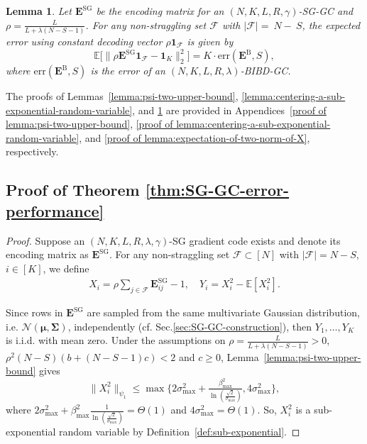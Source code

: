 \documentclass[lettersize,journal]{IEEEtran}
\newcommand{\err}[1]{\mathrm{err}(#1, S)}
\newcommand{\norm}[1]{\left\lVert#1\right\rVert}
\newcommand{\ones}[1]{\boldsymbol{1}_{#1}}
\newcommand{\F}{\mathcal{F}}
\newcommand{\GSG}{\boldsymbol{E}^{\mathrm{SG}}}
\newcommand{\GB}{\boldsymbol{E}^{\mathrm{B}}}
\newcommand{\gaussian}[2]{\mathcal{N}(#1, #2)}
\newcommand{\muu}{\boldsymbol{\mu}}
\newcommand{\Sigmaa}{\boldsymbol{\Sigma}}
\newcommand{\ex}[1]{\mathbb{E}\left[#1\right]}
\newcommand{\psione}[1]{\|#1\|_{\psi_1} }
\newcommand{\sigmamax}{\sigma_{\max}}
\newcommand{\betamax}{\beta_{\max}}
\newtheorem{lemma}{Lemma}
\begin{document}
{\begin{lemma}
\label{lemma:expectation-of-two-norm-of-X}
Let $\GSG$ be the encoding matrix for an $(N, K, L, R, \gamma)$-SG-GC and $\rho = \frac{L}{L+\lambda(N-S-1)}$. For any non-straggling set $\F$ with $|\F| =~N-~S$, the expected error using constant decoding vector $\rho\ones{\F}$ is given by
  \[
    \mathbb{E}\big[{\|\rho\GSG\ones{\F} - \ones{K}}\|_2^2\big]=K\cdot\err{\GB},
    \]
     where $\err{\GB}$ is the error of an $(N, K, L, R, \lambda)$-BIBD-GC.
\end{lemma}
The proofs of Lemmas~\ref{lemma:psi-two-upper-bound}, \ref{lemma:centering-a-sub-exponential-random-variable}, and \ref{lemma:expectation-of-two-norm-of-X} are provided in Appendices~\ref{proof of lemma:psi-two-upper-bound}, \ref{proof of lemma:centering-a-sub-exponential-random-variable}, and \ref{proof of lemma:expectation-of-two-norm-of-X}, respectively.

\subsection{Proof of Theorem \ref{thm:SG-GC-error-performance}}
\begin{proof}
\label{proof of thm:SG-GC-error-performance}
Suppose an $(N, K, L, R, \lambda, \gamma)$-SG gradient code exists and
denote its encoding matrix as $\GSG$. For any non-straggling set $\F\subset[N]$ with $|\F|=N-S,$ $ i\in[K]$, we define
\begin{align}
X_i = \rho \textstyle\sum_{j\in \F} \GSG_{ij} -1,\quad 
Y_i = X_i^2 - \ex{X_i^2}.
\end{align}

Since rows in $\GSG$ are sampled from the same multivariate Gaussian distribution, i.e. $\gaussian{\muu}{\Sigmaa}$, independently (cf. Sec.\ref{sec:SG-GC-construction}), then $Y_1, \dots, Y_K$ is i.i.d. with mean zero. 
Under the assumptions on $\rho = \frac{L}{L+\lambda(N-S-1)}>0$, $\rho^2(N-S)(b+(N-S-1)c)<2$ and $c\geq 0$, Lemma~\ref{lemma:psi-two-upper-bound} gives
\begin{equation*}
    \psione{X_i^2}\le \max\bigg\{2\sigmamax^2 + \tfrac{\betamax^2}{\ln{(\tfrac{\sqrt{2}}{\sigmamax})}}, 4\sigmamax^2\bigg\},
\end{equation*}
where $2\sigmamax^2 + \betamax^2\frac{1}{\ln{(\frac{\sqrt{2}}{\sigmamax})}} = \Theta (1)$ and $4\sigmamax^2 = \Theta(1)$.
So, 
$X_i^2$ is a sub-exponential random variable by Definition~\ref{def:sub-exponential}.


\end{proof}}
\end{document}
